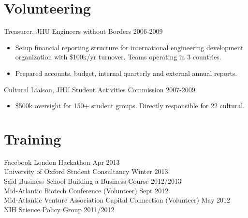\documentclass[margin]{res}
\newcommand{\nbdatesubsection}[2]{#1 \hfill #2 }
\begin{document}
\begin{sloppypar}
\begin{resume}
\section{Volunteering}
\nbdatesubsection{Treasurer, JHU Engineers without Borders}{2006-2009}
    \begin{itemize}
        \item Setup financial reporting structure for international engineering development organization with \$100k/yr turnover. Teams operating in 3 countries.
        \item Prepared accounts, budget, internal quarterly and external annual reports.
    \end{itemize}
\nbdatesubsection{Cultural Liaison, JHU Student Activities Commission}{2007-2009}
    \begin{itemize}
        \item \$500k oversight for 150+ student groups. Directly responsible for 22 cultural.
    \end{itemize}



\section{Training}
\nbdatesubsection{Facebook London Hackathon}{Apr 2013} \\
\nbdatesubsection{University of Oxford Student Consultancy}{Winter 2013} \\
\nbdatesubsection{Sa\"\i d Business School Building a Business Course}{2012/2013} \\
\nbdatesubsection{Mid-Atlantic Biotech Conference (Volunteer)}{Sept 2012} \\
\nbdatesubsection{Mid-Atlantic Venture Association Capital Connection (Volunteer)}{May 2012} \\
\nbdatesubsection{NIH Science Policy Group}{2011/2012} 




\end{resume}
\end{sloppypar}
\end{document}
